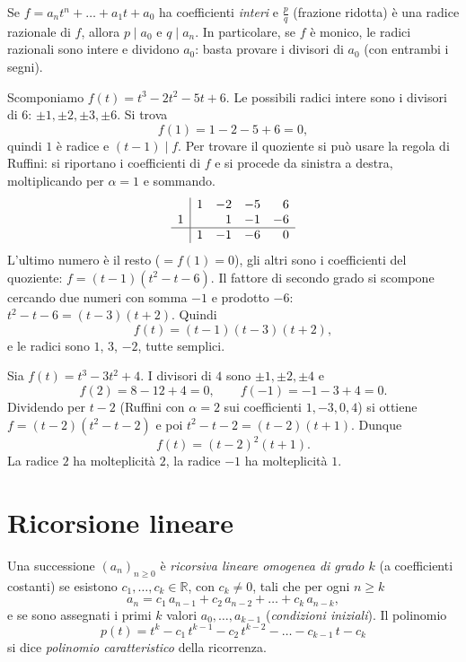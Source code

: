 \documentclass[11pt,a4paper]{article}
\begin{document}
\begin{osservazione}
Se $f = a_n t^n + \dots + a_1 t + a_0$ ha coefficienti \emph{interi} e
$\frac{p}{q}$ (frazione ridotta) è una radice razionale di $f$, allora
$p \mid a_0$ e $q \mid a_n$. In particolare, se $f$ è monico, le radici
razionali sono intere e dividono $a_0$: basta provare i divisori di $a_0$
(con entrambi i segni).
\end{osservazione}

\begin{esempio}
Scomponiamo $f(t) = t^3 - 2t^2 - 5t + 6$. Le possibili radici intere sono i
divisori di $6$: $\pm 1, \pm 2, \pm 3, \pm 6$. Si trova
\[
  f(1) = 1 - 2 - 5 + 6 = 0 ,
\]
quindi $1$ è radice e $(t - 1) \mid f$. Per trovare il quoziente si può
usare la regola di Ruffini: si riportano i coefficienti di $f$ e si procede
da sinistra a destra, moltiplicando per $\alpha = 1$ e sommando.
\[
\begin{array}{r|rrrr}
   & 1 & -2 & -5 & 6 \\
 1 &   &  1 & -1 & -6 \\ \hline
   & 1 & -1 & -6 & \;0
\end{array}
\]
L'ultimo numero è il resto ($=f(1)=0$), gli altri sono i coefficienti del
quoziente: $f = (t - 1)(t^2 - t - 6)$. Il fattore di secondo grado si
scompone cercando due numeri con somma $-1$ e prodotto $-6$:
$t^2 - t - 6 = (t - 3)(t + 2)$. Quindi
\[
  f(t) = (t - 1)(t - 3)(t + 2),
\]
e le radici sono $1$, $3$, $-2$, tutte semplici.
\end{esempio}

\begin{esempio}
Sia $f(t) = t^3 - 3t^2 + 4$. I divisori di $4$ sono $\pm 1, \pm 2, \pm 4$ e
\[
  f(2) = 8 - 12 + 4 = 0 , \qquad f(-1) = -1 - 3 + 4 = 0 .
\]
Dividendo per $t - 2$ (Ruffini con $\alpha = 2$ sui coefficienti
$1, -3, 0, 4$) si ottiene $f = (t - 2)(t^2 - t - 2)$ e poi
$t^2 - t - 2 = (t - 2)(t + 1)$. Dunque
\[
  f(t) = (t - 2)^2 (t + 1) .
\]
La radice $2$ ha molteplicità $2$, la radice $-1$ ha molteplicità $1$.
\end{esempio}

\section{Ricorsione lineare}

\begin{definizione}
Una successione $(a_n)_{n \geq 0}$ è \emph{ricorsiva lineare omogenea di grado
$k$} (a coefficienti costanti) se esistono $c_1, \dots, c_k \in \mathbb{R}$,
con $c_k \neq 0$, tali che per ogni $n \geq k$
\[
  a_n = c_1\, a_{n-1} + c_2\, a_{n-2} + \dots + c_k\, a_{n-k} ,
\]
e se sono assegnati i primi $k$ valori $a_0, \dots, a_{k-1}$ (\emph{condizioni
iniziali}). Il polinomio
\[
  p(t) = t^k - c_1\, t^{k-1} - c_2\, t^{k-2} - \dots - c_{k-1}\, t - c_k
\]
si dice \emph{polinomio caratteristico} della ricorrenza.
\end{definizione}
\end{document}
